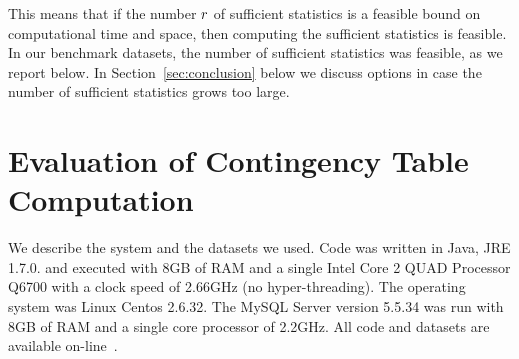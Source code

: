 \documentclass{acm_proc_article-sp}
\newcommand{\ct}{\mathit{ct}}
\begin{document}
This means that
if the number $r$ of sufficient statistics is a feasible bound on computational time and space, then computing the sufficient statistics is feasible. In our benchmark datasets, the number of sufficient statistics was feasible, as we report below. 
In Section~\ref{sec:conclusion} below we discuss options in case the number of sufficient statistics  grows too large.
%
%
%







\section{Evaluation of Contingency Table Computation} 
We describe the system and the datasets we used.
Code was written in Java, JRE 1.7.0.  and executed with 8GB of RAM and a single Intel Core 2 QUAD Processor Q6700 with a clock speed of 2.66GHz (no hyper-threading). The operating system was Linux Centos 2.6.32. 
The MySQL Server version 5.5.34 was run with 8GB of RAM and a single core processor of 2.2GHz. 
All code and datasets are available on-line~\cite{bib:jbnsite}.
\end{document}
